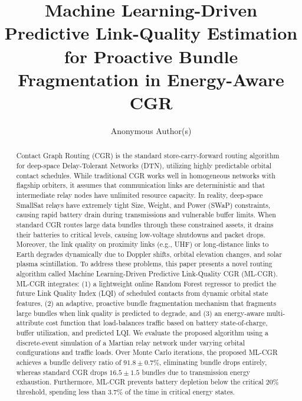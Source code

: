 \documentclass[a4paper,fleqn]{cas-dc}
\newcommand{\mlcgr}{\textsf{ML-CGR}}
\begin{document}
\let\WriteBookmarks\relax
\def\floatpagepagefraction{1}
\def\textpagefraction{.001}


\title [mode = title]{Machine Learning-Driven Predictive Link-Quality Estimation for Proactive Bundle Fragmentation in Energy-Aware CGR}

\author{Anonymous Author(s)}

\begin{abstract}
Contact Graph Routing (CGR) is the standard store-carry-forward routing algorithm for deep-space Delay-Tolerant Networks (DTN), utilizing highly predictable orbital contact schedules. While traditional CGR works well in homogeneous networks with flagship orbiters, it assumes that communication links are deterministic and that intermediate relay nodes have unlimited resource capacity. In reality, deep-space SmallSat relays have extremely tight Size, Weight, and Power (SWaP) constraints, causing rapid battery drain during transmissions and vulnerable buffer limits. When standard CGR routes large data bundles through these constrained assets, it drains their batteries to critical levels, causing low-voltage shutdowns and packet drops. Moreover, the link quality on proximity links (e.g., UHF) or long-distance links to Earth degrades dynamically due to Doppler shifts, orbital elevation changes, and solar plasma scintillation. To address these problems, this paper presents a novel routing algorithm called Machine Learning-Driven Predictive Link-Quality CGR (\mlcgr{}). \mlcgr{} integrates: (1) a lightweight online Random Forest regressor to predict the future Link Quality Index (LQI) of scheduled contacts from dynamic orbital state features, (2) an adaptive, proactive bundle fragmentation mechanism that fragments large bundles when link quality is predicted to degrade, and (3) an energy-aware multi-attribute cost function that load-balances traffic based on battery state-of-charge, buffer utilization, and predicted LQI. We evaluate the proposed algorithm using a discrete-event simulation of a Martian relay network under varying orbital configurations and traffic loads. Over Monte Carlo iterations, the proposed \mlcgr{} achieves a bundle delivery ratio of $91.8 \pm 0.7\%$, eliminating bundle drops entirely, whereas standard CGR drops $16.5 \pm 1.5$ bundles due to transmission energy exhaustion. Furthermore, \mlcgr{} prevents battery depletion below the critical $20\%$ threshold, spending less than $3.7\%$ of the time in critical energy states.
\end{abstract}
\end{document}
